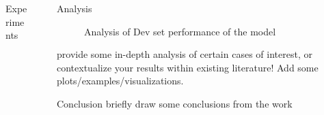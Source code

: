\documentclass[final]{beamer}
\newlength{\sepwidth}
\newlength{\colwidth}
\newcommand{\separatorcolumn}{\begin{column}{\sepwidth}\end{column}}
\begin{document}
\begin{frame}[t]
\begin{columns}[t]
\begin{column}{\colwidth}
\begin{block}{Experiments}
  \end{block}

\end{column}

\separatorcolumn

\begin{column}{\colwidth}

  \begin{block}{Analysis}
    \begin{figure}[H]%
      \centering
      \hfill
      \hfill
      \caption{Analysis of Dev set performance of the model
      }%
      \label{fig:analysis}%
    \end{figure}
    provide some in-depth analysis of certain cases of interest, or contextualize your results within existing literature! Add some plots/examples/visualizations.
  \end{block}

  \begin{block}{Conclusion}
    briefly draw some conclusions from the work
    \cite{xie2020unsupervised}
  \end{block}

  
  


\end{column}

\separatorcolumn
\end{columns}
\end{frame}
\end{document}
